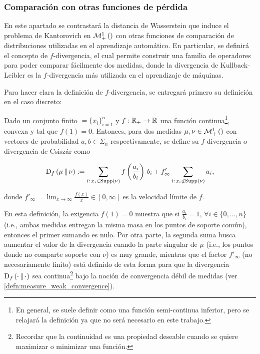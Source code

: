 \subsubsection{Comparación con otras funciones de pérdida}

En este apartado se contrastará la distancia de Wasserstein que induce el problema de Kantorovich en $\mathcal{M}_+^1\left(\right)$ con otras funciones de comparación de distribuciones utilizadas en el aprendizaje automático. En particular, se definirá el concepto de $f$-divergencia, el cual permite construir una familia de operadores para poder comparar fácilmente dos medidas, donde la divergencia de Kullback-Leibler es la $f$-divergencia más utilizada en el aprendizaje de máquinas.

Para hacer clara la definición de $f$-divergencia, se entregará primero su definición en el caso discreto:

\begin{defn}
	\label{defn:f_div_discrete}
	Dado un conjunto finito $\xspace=\{x_i\}_{i=1}^n$ y $f:\mathbb{R}_+\to\mathbb{R}$ una función continua\footnote{En general, se suele definir como una función semi-continua inferior, pero se relajará la definición ya que no será necesario en este trabajo.}, convexa y tal que $f(1)=0$. Entonces, para dos medidas $\mu,\nu\in\mathcal{M}_+^1\left(\right)$ con vectores de probabilidad $a,b\in\Sigma_n$ respectivamente, se define su $f$-divergencia o divergencia de Csiszár como

	\begin{equation*}
		\operatorname{D}_f\left(\mu\,\|\,\nu\right)
		:= \sum_{i:\, x_i\in\operatorname{Supp}\left(\nu\right)} f\left(\frac{a_i}{b_i}\right)\, b_i + f'_\infty\sum_{i:\, x_i\not\in\operatorname{Supp}\left(\nu\right)} a_i ,
	\end{equation*}

	donde $f'_\infty = \lim_{x\to\infty} \frac{f(x)}{x}\in[0,\infty]$ es la velocidad límite de $f$.
\end{defn}

En esta definición, la exigencia $f(1)=0$ muestra que si $\frac{a_i}{b_i} = 1,\,\forall i\in\{0,\ldots,n\}$ (i.e., ambas medidas entregan la misma masa en los puntos de soporte común), entonces el primer sumando es nulo. Por otra parte, la segunda suma busca aumentar el valor de la divergencia cuando la parte singular de $\mu$ (i.e., los puntos donde no comparte soporte con $\nu$) es muy grande, mientras que el factor $f'_\infty$ (no necesariamente finito) está definido de esta forma para que la divergencia $\operatorname{D}_f\left(\cdot\,\|\,\cdot\right)$ sea continua\footnote{Recordar que la continuidad es una propiedad deseable cuando se quiere maximizar o minimizar una función.} bajo la noción de convergencia débil de medidas (ver \autoref{defn:measure_weak_convergence}).

